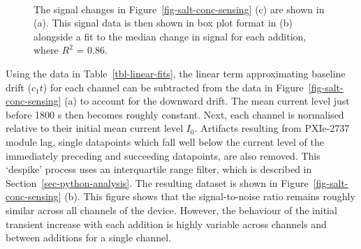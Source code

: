 \documentclass[
  a4paper,
]{scrbook}
\begin{document}
\begin{figure}
\begin{minipage}[t]{0.65\linewidth}
{{}

}

\end{minipage}%
%
\begin{minipage}[t]{0.17\linewidth}

{\centering 

~

}

\end{minipage}%

\caption{\label{fig-salt-conc-signal}The signal changes in
Figure~\ref{fig-salt-conc-sensing} (c) are shown in (a). This signal
data is then shown in box plot format in (b) alongside a fit to the
median change in signal for each addition, where \(R^2\) = 0.86.}

\end{figure}

Using the data in Table~\ref{tbl-linear-fits}, the linear term
approximating baseline drift (\(c_1t\)) for each channel can be
subtracted from the data in Figure~\ref{fig-salt-conc-sensing} (a) to
account for the downward drift. The mean current level just before 1800
s then becomes roughly constant. Next, each channel is normalised
relative to their initial mean current level \(I_{0}\). Artifacts
resulting from PXIe-2737 module lag, single datapoints which fall well
below the current level of the immediately preceding and succeeding
datapoints, are also removed. This `despike' process uses an
interquartile range filter, which is described in
Section~\ref{sec-python-analysis}. The resulting dataset is shown in
Figure~\ref{fig-salt-conc-sensing} (b). This figure shows that the
signal-to-noise ratio remains roughly similar across all channels of the
device. However, the behaviour of the initial transient increase with
each addition is highly variable across channels and between additions
for a single channel.
\end{document}
